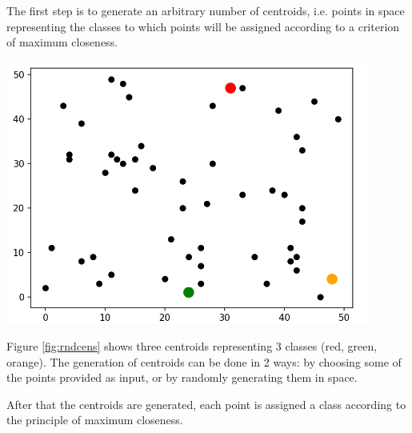 \documentclass{report}
\begin{document}
\begin{minipage}[b]{0.48\textwidth}
  The first step is to generate an arbitrary number of centroids, i.e. points in space representing the classes to which points will be assigned according to a criterion of maximum closeness.

  \begin{center}
      \includegraphics[width = 0.9\textwidth]{imgs/rndcens.png}
      \label{fig:rndcens}
  \end{center}

  Figure \ref{fig:rndcens} shows three centroids representing 3 classes (red, green, orange). The generation of centroids can be done in 2 ways: by choosing some of the points provided as input, or by randomly generating them in space.

  After that the centroids are generated, each point is assigned a class according to the principle of maximum closeness. 

\end{minipage}
\hspace{0.1in}
\end{document}
